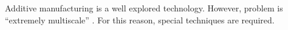 Additive manufacturing is a well explored
technology.
However, problem is ``extremely multiscale''
\cite{Hodge2021}. For this reason,
special techniques are required.
